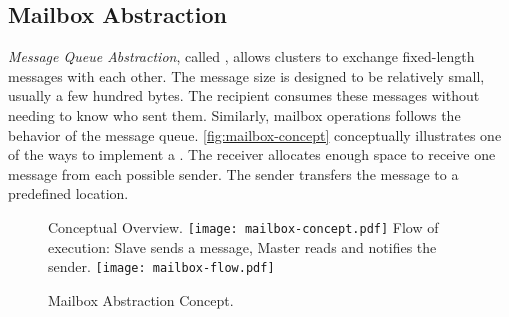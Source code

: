 		\subsection{Mailbox Abstraction}
		\label{sec.mailbox-abs}




			\textit{Message Queue Abstraction}, called \mailbox, allows clusters to exchange
			fixed-length messages with each other. The message size is designed to be
			relatively small, usually a few hundred bytes. The recipient consumes these
			messages without needing to know who sent them. Similarly, mailbox operations
			follows the behavior of the \posix message queue. \autoref{fig:mailbox-concept}
			conceptually illustrates one of the ways to implement a \mailbox. The receiver
			allocates enough space to receive one message from each possible sender.
			The sender transfers the message to a predefined location.

			\begin{figure}[!tb]
				\centering%
				\caption{Mailbox Abstraction Concept.}%
				\label{fig:mailbox}%

					{Conceptual Overview.}%
					{\texttt{[image: mailbox-concept.pdf]}}%
				\hspace{1cm}%
					{Flow of execution: Slave sends a message, Master reads and notifies the sender.}%
					{\texttt{[image: mailbox-flow.pdf]}}%

			\end{figure}

